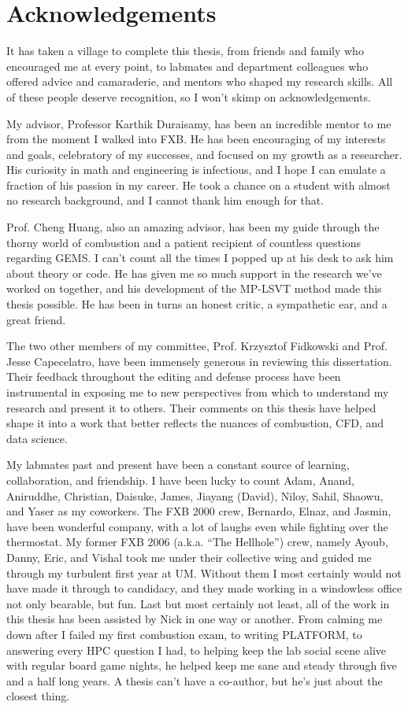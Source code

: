 \chapter{Acknowledgements}

It has taken a village to complete this thesis, from friends and family who encouraged me at every point, to labmates and department colleagues who offered advice and camaraderie, and mentors who shaped my research skills. All of these people deserve recognition, so I won't skimp on acknowledgements.

My advisor, Professor Karthik Duraisamy, has been an incredible mentor to me from the moment I walked into FXB. He has been encouraging of my interests and goals, celebratory of my successes, and focused on my growth as a researcher. His curiosity in math and engineering is infectious, and I hope I can emulate a fraction of his passion in my career. He took a chance on a student with almost no research background, and I cannot thank him enough for that.

Prof. Cheng Huang, also an amazing advisor, has been my guide through the thorny world of combustion and a patient recipient of countless questions regarding GEMS. I can't count all the times I popped up at his desk to ask him about theory or code. He has given me so much support in the research we've worked on together, and his development of the MP-LSVT method made this thesis possible. He has been in turns an honest critic, a sympathetic ear, and a great friend.

The two other members of my committee, Prof. Krzysztof Fidkowski and Prof. Jesse Capecelatro, have been immensely generous in reviewing this dissertation. Their feedback throughout the editing and defense process have been instrumental in exposing me to new perspectives from which to understand my research and present it to others. Their comments on this thesis have helped shape it into a work that better reflects the nuances of combustion, CFD, and data science.

My labmates past and present have been a constant source of learning, collaboration, and friendship. I have been lucky to count Adam, Anand, Aniruddhe, Christian, Daisuke, James, Jiayang (David), Niloy, Sahil, Shaowu, and Yaser as my coworkers. The FXB 2000 crew, Bernardo, Elnaz, and Jasmin, have been wonderful company, with a lot of laughs even while fighting over the thermostat. My former FXB 2006 (a.k.a. ``The Hellhole'') crew, namely Ayoub, Danny, Eric, and Vishal took me under their collective wing and guided me through my turbulent first year at UM. Without them I most certainly would not have made it through to candidacy, and they made working in a windowless office not only bearable, but fun. Last but most certainly not least, all of the work in this thesis has been assisted by Nick in one way or another. From calming me down after I failed my first combustion exam, to writing PLATFORM, to answering every HPC question I had, to helping keep the lab social scene alive with regular board game nights, he helped keep me sane and steady through five and a half long years. A thesis can't have a co-author, but he's just about the closest thing.

